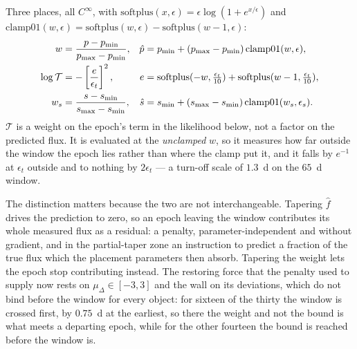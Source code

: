 \documentclass[11pt]{article}
\begin{document}
Three places, all $C^{\infty}$, with
$\mathrm{softplus}(x,\epsilon) = \epsilon\log(1 + e^{x/\epsilon})$ and
$\mathrm{clamp01}(w,\epsilon) = \mathrm{softplus}(w,\epsilon) - \mathrm{softplus}(w-1,\epsilon)$:
\begin{align}
  w &= \frac{p - p_{\min}}{p_{\max} - p_{\min}} , &
  \hat{p} &= p_{\min} + (p_{\max}-p_{\min})\,\mathrm{clamp01}(w,\epsilon) ,\\
  \log\mathcal{T} &= -\left[\frac{e}{\epsilon_{t}}\right]^{2} , &
  e &= \mathrm{softplus}(-w, \tfrac{\epsilon_{t}}{10})
      + \mathrm{softplus}(w - 1, \tfrac{\epsilon_{t}}{10}) ,\\
  w_{s} &= \frac{s - s_{\min}}{s_{\max} - s_{\min}} , &
  \hat{s} &= s_{\min} + (s_{\max} - s_{\min})\,\mathrm{clamp01}(w_{s},\epsilon_{s}) .
\end{align}
$\mathcal{T}$ is a weight on the epoch's term in the likelihood below, not a factor on the
predicted flux. It is evaluated at the \emph{unclamped} $w$, so it measures how far outside
the window the epoch lies rather than where the clamp put it, and it falls by $e^{-1}$ at
$\epsilon_{t}$ outside and to nothing by $2\epsilon_{t}$ --- a turn-off scale of $1.3$~d on
the $65$~d window.

The distinction matters because the two are not interchangeable. Tapering $\hat f$ drives
the prediction to zero, so an epoch leaving the window contributes its whole measured flux
as a residual: a penalty, parameter-independent and without gradient, and in the
partial-taper zone an instruction to predict a fraction of the true flux which the
placement parameters then absorb. Tapering the weight lets the epoch stop contributing
instead. The restoring force that the penalty used to supply now rests on
$\mu_{\Delta} \in [-3, 3]$ and the wall on its deviations, which do not bind before the
window for every object: for sixteen of the thirty the window is crossed first, by
$0.75$~d at the earliest, so there the weight and not the bound is what meets a departing
epoch, while for the other fourteen the bound is reached before the window is.
\end{document}
